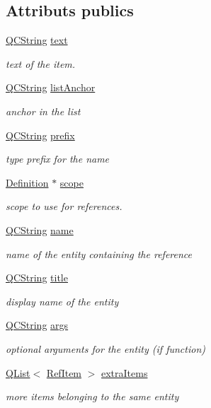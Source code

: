 \subsection*{Attributs publics}
\begin{DoxyCompactItemize}
\item 
\hyperlink{class_q_c_string}{Q\+C\+String} \hyperlink{struct_ref_item_a03313f190ccfba8be0bcfbb5dedf6c73}{text}
\begin{DoxyCompactList}\small\item\em text of the item. \end{DoxyCompactList}\item 
\hyperlink{class_q_c_string}{Q\+C\+String} \hyperlink{struct_ref_item_a06a0f029d92e3573e65f94a2a106b95f}{list\+Anchor}
\begin{DoxyCompactList}\small\item\em anchor in the list \end{DoxyCompactList}\item 
\hyperlink{class_q_c_string}{Q\+C\+String} \hyperlink{struct_ref_item_a5bc1b5fe84242499696ff7414217fd58}{prefix}
\begin{DoxyCompactList}\small\item\em type prefix for the name \end{DoxyCompactList}\item 
\hyperlink{class_definition}{Definition} $\ast$ \hyperlink{struct_ref_item_a627583db0bcc1f4fb12b8825a5a93670}{scope}
\begin{DoxyCompactList}\small\item\em scope to use for references. \end{DoxyCompactList}\item 
\hyperlink{class_q_c_string}{Q\+C\+String} \hyperlink{struct_ref_item_a1235c4acaa9aa9bfece34c6d7f654ef0}{name}
\begin{DoxyCompactList}\small\item\em name of the entity containing the reference \end{DoxyCompactList}\item 
\hyperlink{class_q_c_string}{Q\+C\+String} \hyperlink{struct_ref_item_a5160b8acde58f43ebfc2842281591acd}{title}
\begin{DoxyCompactList}\small\item\em display name of the entity \end{DoxyCompactList}\item 
\hyperlink{class_q_c_string}{Q\+C\+String} \hyperlink{struct_ref_item_abe88c74f88bcacf9fa2d16c797742910}{args}
\begin{DoxyCompactList}\small\item\em optional arguments for the entity (if function) \end{DoxyCompactList}\item 
\hyperlink{class_q_list}{Q\+List}$<$ \hyperlink{struct_ref_item}{Ref\+Item} $>$ \hyperlink{struct_ref_item_ab530bdf51cf559d443a6183a93fe37b6}{extra\+Items}
\begin{DoxyCompactList}\small\item\em more items belonging to the same entity \end{DoxyCompactList}\end{DoxyCompactItemize}


